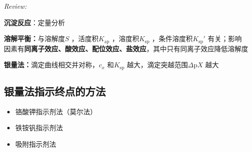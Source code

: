 \textit{Review:}

\textbf{沉淀反应}：定量分析

\textbf{溶解平衡：}与溶解度$S$ ，活度积$K_\text{ap}$ ，溶度积$K_\text{sp}$ ，条件溶度积$K_\text{sp}'$ 有关；影响因素有\textbf{同离子效应、酸效应、配位效应、盐效应}，其中只有同离子效应降低溶解度

\textbf{银量法：}滴定曲线相交并对称，$c_x$ 和$K_\text{sp}$ 越大，滴定突越范围$\Delta \text{p}X$ 越大

\subsection{银量法指示终点的方法}%
\label{sub:银量法指示终点的方法}
\begin{itemize}
    \item 铬酸钾指示剂法（莫尔法）
    \item 铁铵钒指示剂法
    \item 吸附指示剂法    
\end{itemize}
